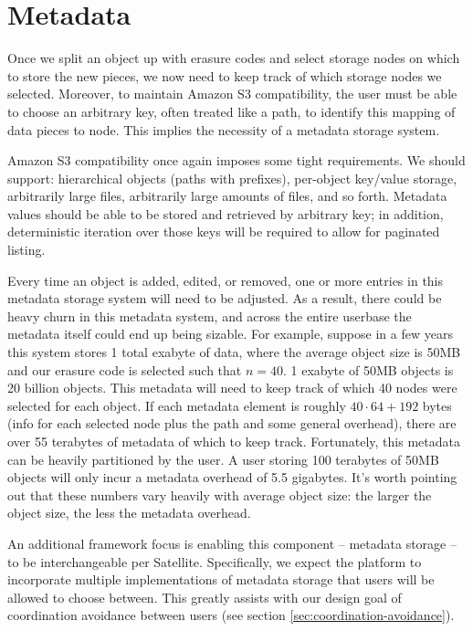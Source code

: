 \documentclass[8pt,fleqn,openany]{book}
\begin{document}
\section{Metadata}\label{sec:framework-metadata}

Once we split an object up with erasure codes and select storage nodes on
which to store the new pieces, we now need to keep track of which storage
nodes we selected.
Moreover, to maintain Amazon S3 compatibility, the user must be able to choose an
arbitrary key, often treated like a path, to identify this mapping of data
pieces to node. This implies the necessity of a metadata storage system.

Amazon S3 compatibility once again imposes some tight requirements.
We should support:
hierarchical objects (paths with prefixes), per-object key/value storage,
arbitrarily large files, arbitrarily large amounts of files, and so forth.
Metadata values
should be able to be stored and retrieved by arbitrary key; in addition,
deterministic iteration over those keys will be required to allow for paginated listing.

Every time an
object is added, edited, or removed, one or more entries in this metadata
storage system will need to be adjusted. As a result, there could be heavy churn
in this metadata system, and across the entire userbase the metadata itself
could end up being sizable.
For example, suppose in
a few years this system stores 1 total exabyte of data, where the average object
size is 50MB and our erasure code is selected such that $n=40$.
1 exabyte of 50MB objects is 20 billion objects.
This metadata will need
to keep track of which 40 nodes were selected for each object.
If each metadata element is roughly $40\cdot 64+192$ bytes (info for each
selected node plus the path and some general overhead), there are over 55
terabytes of metadata of which to keep track.
Fortunately, this metadata can be heavily partitioned by the user. A user storing
100 terabytes of 50MB objects will only incur a metadata overhead of 5.5
gigabytes. It's worth pointing out that these numbers vary
heavily with average object size: the larger the object size, the less the
metadata overhead.

An additional framework focus is enabling this component -- metadata
storage -- to be interchangeable per Satellite. Specifically, we expect the platform to incorporate
multiple implementations of metadata storage that users will be allowed to
choose between. This greatly assists with our design goal of coordination
avoidance between users (see section \ref{sec:coordination-avoidance}).
\end{document}

